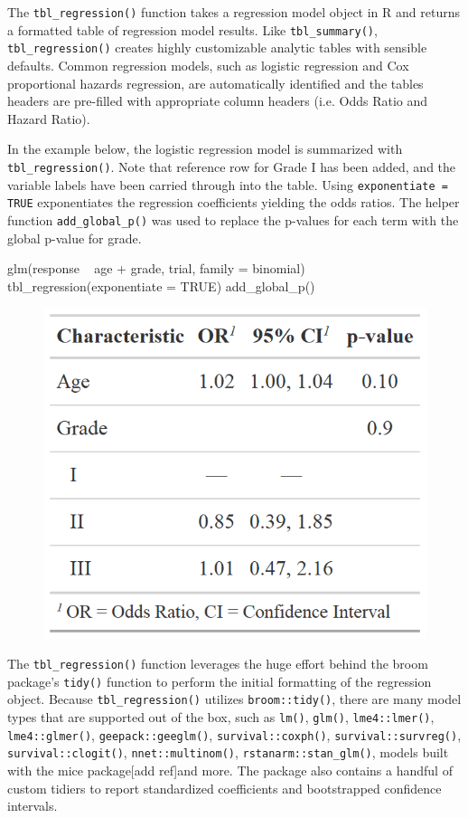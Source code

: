The \texttt{tbl\_regression()} function takes a regression model object in R and returns a formatted table of regression model results. 
Like \texttt{tbl\_summary()}, \texttt{tbl\_regression()} creates highly customizable analytic tables with sensible defaults.
Common regression models, such as logistic regression and Cox proportional hazards regression, are automatically identified and the tables headers are pre-filled with appropriate column headers (i.e. Odds Ratio and Hazard Ratio).

In the example below, the logistic regression model is summarized with \texttt{tbl\_regression()}.
Note that reference row for Grade I has been added, and the variable labels have been carried through into the table.
Using \texttt{exponentiate = TRUE} exponentiates the regression coefficients yielding the odds ratios.
The helper function \texttt{add\_global\_p()} was used to replace the p-values for each term with the global p-value for grade.

\begin{example}
glm(response ~ age + grade, trial, family = binomial) %
  tbl_regression(exponentiate = TRUE) %
  add_global_p()
\end{example}

\begin{figure}[h!]
  \includegraphics[scale=0.28]{regression.png}
  \centering
\end{figure}

The \texttt{tbl\_regression()} function leverages the huge effort behind the broom package's \texttt{tidy()} function \citep{broom} to perform the initial formatting of the regression object.
Because \texttt{tbl\_regression()} utilizes \texttt{broom::tidy()}, there are many model types that are supported out of the box, such as \texttt{lm()}, \texttt{glm()}, \texttt{lme4::lmer()}, \texttt{lme4::glmer()}, \texttt{geepack::geeglm()}, \texttt{survival::coxph()}, \texttt{survival::survreg()}, \texttt{survival::clogit()}, \texttt{nnet::multinom()}, \texttt{rstanarm::stan\_glm()}, models built with the mice package[add ref]and more. The  package also contains a handful of custom tidiers to report standardized coefficients and bootstrapped confidence intervals.

